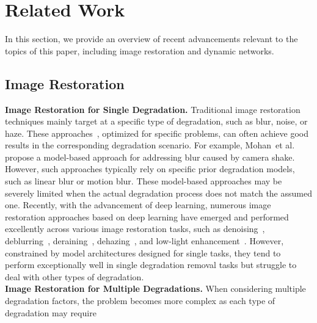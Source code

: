 \section{Related Work}
In this section, we provide an overview of recent advancements relevant to the topics of this paper, including image restoration and dynamic networks. 
\subsection{Image Restoration}
\textbf{Image Restoration for Single Degradation.} Traditional image restoration techniques mainly target at a specific type of degradation, such as blur, noise, or haze. These approaches~\cite{R_Girish_Ambasamudram_2019,Xu_Zhang_Zhang_Feng_2017,Luo2015RemovingRF,Malhotra2016SingleIH,Dong2010ImageDA}, optimized for specific problems, can often achieve good results in the corresponding degradation scenario. For example, Mohan~et al.~\cite{R_Girish_Ambasamudram_2019} propose a model-based approach for addressing blur caused by camera shake. However, such approaches typically rely on specific prior degradation models, such as linear blur or motion blur. These model-based approaches may be severely limited when the actual degradation process does not match the assumed one. Recently, with the advancement of deep learning, numerous image restoration approaches based on deep learning have emerged  and performed excellently across various image restoration tasks, such as denoising~\cite{Guo_Yan_Zhang_Zuo_Zhang_2019,Zhang_Zuo_Chen_Meng_Zhang_2017,Wang_Liu_Li_Han,yao2023towards,Zhang_Zhou_Jiang_Fu_2023}, deblurring~\cite{Asim_Shamshad_Ahmed_2018,Nah_Kim_Lee_2017,Pan_Ren_Hu_Yang_2018,Sree2023AdaptiveOD,Wu2023BroadSI}, deraining~\cite{Xiao2022ImageDT,Li2018RecurrentSC,Jiang2020MultiScalePF,Fu2016ClearingTS,Jiang2021MultiScaleHF,10336721}, dehazing~\cite{Engin2018CycleDehazeEC,Wu2021ContrastiveLF,Qu2019EnhancedPD,Zhao2021RefineDNetAW}, and low-light enhancement~\cite{Frants2023QCNNHSD,Ma2022TowardFF,Ma2022TowardFF,Fu2023LearningAS,Xu2023LowLightIE,Wang2021LowLightIE,Xu2022SNRAwareLI}. However, constrained by model architectures designed for single tasks, they tend to perform exceptionally well in single degradation removal tasks but struggle to deal with other types of degradation.
\\
\textbf{Image Restoration for Multiple Degradations.} When considering multiple degradation factors, the problem becomes more complex as each type of degradation may require 

